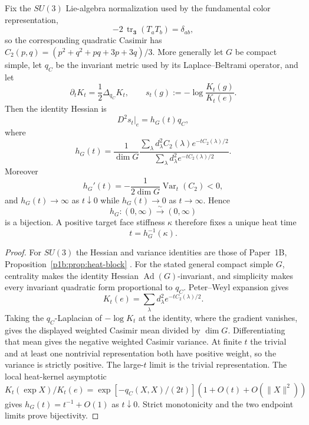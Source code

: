 \documentclass[12pt,a4paper]{article}
\begin{document}
\begin{theorem}
\label{p10:thm:v185-heat-hessian-inversion}
Fix the $SU(3)$ Lie-algebra normalization used by the fundamental color
representation,
\[
 -2\,\operatorname{tr}_{\mathbf3}(T_aT_b)=\delta_{ab},
\]
so the corresponding quadratic Casimir has
$C_2(p,q)=(p^2+q^2+pq+3p+3q)/3$.  More generally let $G$ be compact simple,
let $q_C$ be the invariant metric used by its Laplace--Beltrami operator, and
let
\[
 \partial_tK_t=\frac12\Delta_{q_C}K_t,
 \qquad
 s_t(g):=-\log\frac{K_t(g)}{K_t(e)}.
\]
Then the identity Hessian is
\[
 D^2s_t|_e=h_G(t)q_C,
\]
where
\[
 \boxed{
 h_G(t)=\frac1{\dim G}
 \frac{\sum_\lambda d_\lambda^2C_2(\lambda)e^{-tC_2(\lambda)/2}}
      {\sum_\lambda d_\lambda^2e^{-tC_2(\lambda)/2}}.}
\]
Moreover
\[
 \boxed{
 h_G'(t)=-\frac1{2\dim G}\operatorname{Var}_t(C_2)<0,}
\]
and
\(
 h_G(t)\to\infty
\)
as $t\downarrow0$ while $h_G(t)\to0$ as $t\to\infty$.  Hence
\[
 \boxed{h_G:(0,\infty)\overset\sim\longrightarrow(0,\infty)}
\]
is a bijection.  A positive target face stiffness $\kappa$ therefore fixes a
unique heat time
\[
 \boxed{t=h_G^{-1}(\kappa).}
\]
\end{theorem}
\begin{proof}
For $SU(3)$ the Hessian and variance identities are those of
Paper~1B, Proposition~\ref{p1b:prop:heat-block}
\cite{Kugelmann2026Paper1B}. For the stated general compact simple $G$,
centrality makes the identity Hessian $\operatorname{Ad}(G)$-invariant, and
simplicity makes every invariant quadratic form proportional to $q_C$.
Peter--Weyl expansion gives
\[
 K_t(e)=\sum_\lambda d_\lambda^2e^{-tC_2(\lambda)/2}.
\]
Taking the $q_C$-Laplacian of $-\log K_t$ at the identity, where the gradient
vanishes, gives the displayed weighted Casimir mean divided by $\dim G$.
Differentiating that mean gives the negative weighted Casimir variance.  At
finite $t$ the trivial and at least one nontrivial representation both have
positive weight, so the variance is strictly positive.  The large-$t$ limit
is the trivial representation.  The local heat-kernel asymptotic
$K_t(\exp X)/K_t(e)=\exp[-q_C(X,X)/(2t)](1+O(t)+O(\|X\|^2))$ gives
$h_G(t)=t^{-1}+O(1)$ as $t\downarrow0$.  Strict monotonicity and the two
endpoint limits prove bijectivity.
\end{proof}
\end{document}
